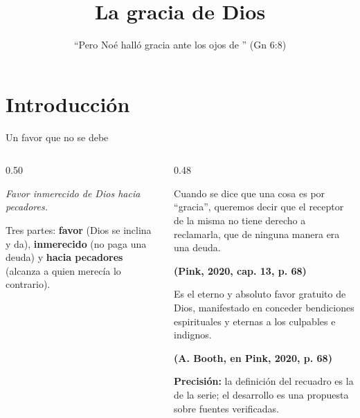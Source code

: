 \documentclass[hyperref={bookmarks=false},aspectratio=169]{beamer}
\title[La gracia]{\bfseries{La gracia de Dios}}
\subtitle{``Pero Noé halló gracia ante los ojos de \SENOR{}'' (Gn 6:8)}
\author{}\institute{}\date{}
\newcommand{\fuente}[1]{\par\hfill{\upshape\bfseries\footnotesize\textcolor{azul}{#1}}}
\newcommand{\destacar}[1]{\textbf{\textcolor{azul}{#1}}}
\newcommand{\precision}[1]{{\footnotesize\color{gris}\textbf{Precisión:} #1}}
\begin{document}
\frame{\titlepage}


\section{Introducción}

\begin{frame}{Un favor que no se debe}
\begin{columns}[c,onlytextwidth]
\begin{column}{0.50\textwidth}
\begin{tcolorbox}[colback=papiro,colframe=dorado,boxrule=1.2pt,arc=3pt]
\centering\large\itshape Favor inmerecido de Dios hacia pecadores.
\end{tcolorbox}
\small\RaggedRight Tres partes: \destacar{favor} (Dios se inclina y da), \destacar{inmerecido} (no paga una deuda) y \destacar{hacia pecadores} (alcanza a quien merecía lo contrario).
\end{column}
\begin{column}{0.48\textwidth}
\scriptsize
\begin{cita}Cuando se dice que una cosa es por ``gracia'', queremos decir que el receptor de la misma no tiene derecho a reclamarla, que de ninguna manera era una deuda.\fuente{(Pink, 2020, cap. 13, p. 68)}\end{cita}
\begin{cita}Es el eterno y absoluto favor gratuito de Dios, manifestado en conceder bendiciones espirituales y eternas a los culpables e indignos.\fuente{(A. Booth, en Pink, 2020, p. 68)}\end{cita}
\precision{la definición del recuadro es la de la serie; el desarrollo es una propuesta sobre fuentes verificadas.}
\end{column}
\end{columns}
\end{frame}
\end{document}
